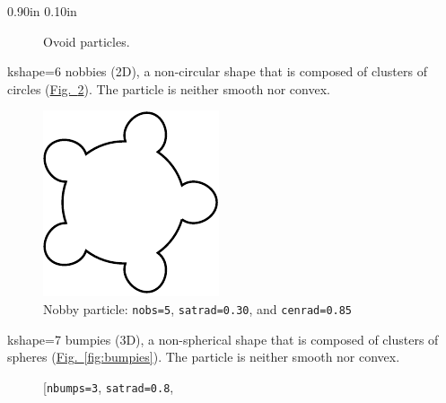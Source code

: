 \documentclass[letterpaper,11pt]{article}
\newlength{\Labelwidth}
\newcommand{\Entrylabel}[1]{\makebox[\Labelwidth][r]{\texttt{#1}}}
\newenvironment{Options}
{\begin{list}{}{%
\renewcommand{\makelabel}{\Entrylabel}%
\setlength{\leftmargin} {0.90in}%
\setlength{\rightmargin}{0.00in}%
\setlength{\labelsep}   {0.10in}%
\setlength{\labelwidth} {\Labelwidth}%
}}
{\end{list}}
\begin{document}
\begin{Options}
\begin{figure}
\caption{Ovoid particles.}
\label{fig:ovoids}
\end{figure}
%
\item[kshape=6]
nobbies (2D), a non-circular shape that is composed
of clusters of circles
(\hyperref[fig:nobbies]{Fig.~\ref*{fig:nobbies}}).
The particle is neither smooth nor convex.
\begin{figure}
\centering
\includegraphics[scale=1.00]{Figures/Nobby_5_03_085}
\caption{Nobby particle: \texttt{nobs=5}, 
                          \texttt{satrad=0.30}, and \texttt{cenrad=0.85}}
\label{fig:nobbies}
\end{figure}
%
\item[kshape=7]
bumpies (3D), a non-spherical shape that is composed
of clusters of spheres
(\hyperref[fig:bumpies]{Fig.~\ref*{fig:bumpies}}).
The particle is neither smooth nor convex.
\begin{figure}
\centering
{}\quad
\subfigure[\texttt{nbumps=3}, \texttt{satrad=0.8}, 

\end{figure}
\end{Options}
\end{document}
